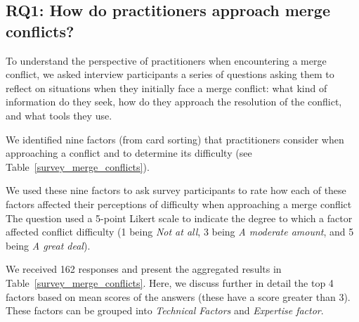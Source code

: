 \subsection{\textbf{RQ1:} How do practitioners approach merge conflicts?}\label{RQ1}
To understand the perspective of practitioners when encountering a merge conflict, we asked interview participants a series of questions asking them to reflect on situations when they initially face a merge conflict: what kind of information do they seek, how do they approach the resolution of the conflict, and what tools they use. 

We identified nine factors (from card sorting) that practitioners consider when approaching a conflict and to determine its difficulty (see Table~\ref{survey_merge_conflicts}). 

We used these nine factors to ask survey participants to rate how each of these factors affected their perceptions of difficulty when approaching a merge conflict
The question used a 5-point Likert scale to indicate the degree to which a factor affected conflict difficulty (1 being \textit{Not at all}, 3 being \textit{A moderate amount}, and 5 being \textit{A great deal}).

We received 162 responses and present the aggregated results in Table~\ref{survey_merge_conflicts}.
Here, we discuss further in detail the top 4 factors based on mean scores of the answers (these have a score greater than 3).
These factors can be grouped into \textit{Technical Factors} and \textit{Expertise factor}.

